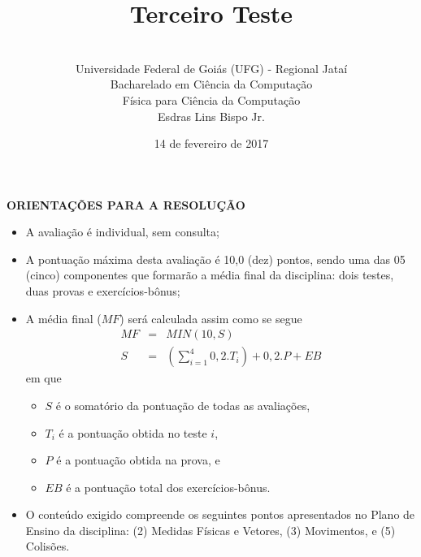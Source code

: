 \documentclass[12pt,a4paper,oneside]{article}
\author{\\Universidade Federal de Goiás (UFG) - Regional Jataí\\Bacharelado em Ciência da Computação \\Física para Ciência da Computação \\Esdras Lins Bispo Jr.}
\title{\sc \huge Terceiro Teste}
\date{14 de fevereiro de 2017}
\begin{document}
\maketitle

{\bf ORIENTAÇÕES PARA A RESOLUÇÃO}

\footnotesize

\begin{itemize}
	\item A avaliação é individual, sem consulta;
	\item A pontuação máxima desta avaliação é 10,0 (dez) pontos, sendo uma das 05 (cinco) componentes que formarão a média final da disciplina: dois testes, duas provas e exercícios-bônus;
	\item A média final ($MF$) será calculada assim como se segue
	\begin{eqnarray}
		MF & = & MIN(10, S) \nonumber \\
		S & = & (\sum_{i=1}^{4} 0,2.T_i ) + 0,2.P  + EB \nonumber
	\end{eqnarray}
	em que 
	\begin{itemize}
		\item $S$ é o somatório da pontuação de todas as avaliações,
		\item $T_i$ é a pontuação obtida no teste $i$,
		\item $P$ é a pontuação obtida na prova, e
		\item $EB$ é a pontuação total dos exercícios-bônus.
	\end{itemize}
	\item O conteúdo exigido compreende os seguintes pontos apresentados no Plano de Ensino da disciplina: (2) Medidas Físicas e Vetores, (3) Movimentos, e (5) Colisões.
\end{itemize}


\begin{center}
\end{center}

\newpage

\normalsize
\end{document}
